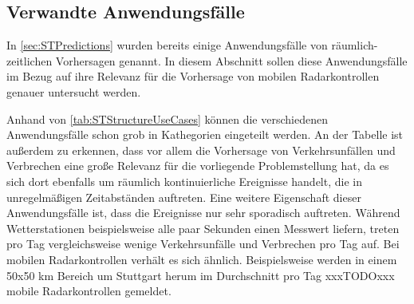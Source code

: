 \subsection{Verwandte Anwendungsfälle}
\label{sec:VerwandteAnwendungsfaelle}
In \autoref{sec:STPredictions} wurden bereits einige Anwendungsfälle von räumlich-zeitlichen Vorhersagen genannt.
In diesem Abschnitt sollen diese Anwendungsfälle im Bezug auf ihre Relevanz für die Vorhersage von mobilen Radarkontrollen genauer untersucht werden.

Anhand von \autoref{tab:STStructureUseCases} können die verschiedenen Anwendungsfälle schon grob in Kathegorien eingeteilt werden.
An der Tabelle ist außerdem zu erkennen, dass vor allem die Vorhersage von Verkehrsunfällen und Verbrechen eine große Relevanz für die vorliegende Problemstellung hat, da es sich dort ebenfalls um räumlich kontinuierliche Ereignisse handelt, die in unregelmäßigen Zeitabständen auftreten.
Eine weitere Eigenschaft dieser Anwendungsfälle ist, dass die Ereignisse nur sehr sporadisch auftreten.
Während Wetterstationen beispielsweise alle paar Sekunden einen Messwert liefern, treten pro Tag vergleichsweise wenige Verkehrsunfälle und Verbrechen pro Tag auf.
Bei mobilen Radarkontrollen verhält es sich ähnlich.
Beispielsweise werden in einem 50x50 km Bereich um Stuttgart herum im Durchschnitt pro Tag xxxTODOxxx mobile Radarkontrollen gemeldet.



